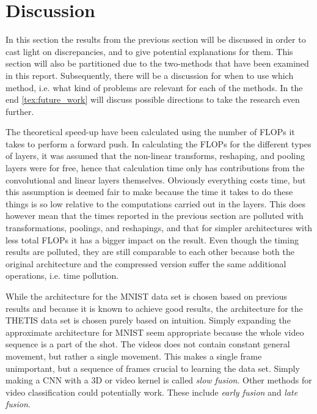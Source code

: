 \section{Discussion} \label{tex:discussion}

In this section the results from the previous section will be discussed in order to cast light on discrepancies, and to give potential explanations for them. This section will also be partitioned due to the two-methods that have been examined in this report. Subsequently, there will be a discussion for when to use which method, i.e. what kind of problems are relevant for each of the methods. In the end \autoref{tex:future_work} will discuss possible directions to take the research even further. 

The theoretical speed-up have been calculated using the number of FLOPs it takes to perform a forward push. In calculating the FLOPs for the different types of layers, it was assumed that the non-linear transforms, reshaping, and pooling layers were for free, hence that calculation time only has contributions from the convolutional and linear layers themselves. Obviously everything costs time, but this assumption is deemed fair to make because the time it takes to do these things is so low relative to the computations carried out in the layers. This does however mean that the times reported in the previous section are polluted with transformations, poolings, and reshapings, and that for simpler architectures with less total FLOPs it has a bigger impact on the result. Even though the timing results are polluted, they are still comparable to each other because both the original architecture and the compressed version suffer the same additional operations, i.e. time pollution.

While the architecture for the MNIST data set is chosen based on previous results and because it is known to achieve good results, the architecture for the THETIS data set is chosen purely based on intuition. Simply expanding the approximate architecture for MNIST seem appropriate because the whole video sequence is a part of the shot. The videos does not contain constant general movement, but rather a single movement. This makes a single frame unimportant, but a sequence of frames crucial to learning the data set. Simply making a CNN with a 3D or video kernel is called \textit{slow fusion}. Other methods for video classification could potentially work. These include \textit{early fusion} and \textit{late fusion}\cite{Karpathy2014}.

